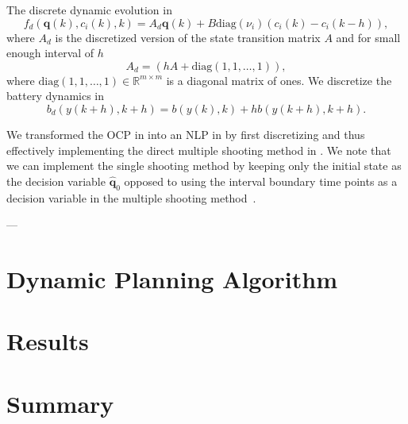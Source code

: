 The discrete dynamic evolution in 
\begin{equation}
  f_d(\mathbf{q}(k),c_i(k),k)=A_d\mathbf{q}(k)+B\mathrm{diag}(\nu_i)(c_i(k)-c_i(k-h)),
\end{equation}
where $A_d$ is the discretized version of the state transition matrix $A$ and for small enough interval of $h$
\begin{equation}
A_d=(hA+\mathrm{diag}(1,1,\dots,1)),
\end{equation}
where $\mathrm{diag}(1,1,\dots,1)\in\mathbb{R}^{m\times m}$ is a diagonal matrix of ones. We discretize the battery dynamics in  
\begin{equation}
  b_d(y(k+h),k+h)=b(y(k),k)+hb(y(k+h),k+h).
\end{equation}

We transformed the OCP in  into an NLP in  by first discretizing and thus effectively implementing the direct multiple shooting method in . We note that we can implement the single shooting method by keeping only the initial state as the decision variable $\hat{\mathbf{q}}_0$ opposed to 
using the interval boundary time points as a decision variable in the multiple shooting method~\citep{rawlings2017model}.


---

\section{\color{cyan}Dynamic Planning Algorithm}
\label{sec:algo}


\section{\color{red}Results}


\section{\color{red}Summary}

